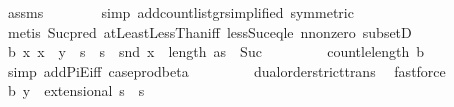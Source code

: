 \begin{isabellebody}
\ assms{\isacharparenleft}{\kern0pt}{}{\isacharparenright}{\kern0pt}\isanewline
\ \ \ \ \ \ \isamarkupfalse%
\ {\isacharparenleft}{\kern0pt}simp\ add{\isacharcolon}{\kern0pt}count{\isacharunderscore}{\kern0pt}list{\isacharunderscore}{\kern0pt}gr{\isacharunderscore}{\kern0pt}{}{\isacharbrackleft}{\kern0pt}simplified{\isacharcomma}{\kern0pt}\ symmetric{\isacharbrackright}{\kern0pt}{\isacharparenright}{\kern0pt}\ \isanewline
\ \ \ \ \ \ \isamarkupfalse%
\ {\isacharparenleft}{\kern0pt}metis\ Suc{\isacharunderscore}{\kern0pt}pred\ atLeastLessThan{\isacharunderscore}{\kern0pt}iff\ less{\isacharunderscore}{\kern0pt}Suc{\isacharunderscore}{\kern0pt}eq{\isacharunderscore}{\kern0pt}le\ n{\isacharunderscore}{\kern0pt}nonzero\ subsetD{\isacharparenright}{\kern0pt}\isanewline
\ \ \ \ \isamarkupfalse%
\ b{}{\isacharcolon}{\kern0pt}\ {\isachardoublequoteopen}{\isasymAnd}x{\isachardot}{\kern0pt}\ x\ {\isasymin}\ y\ {\isacharbackquote}{\kern0pt}\ {\isacharparenleft}{\kern0pt}{\isacharbraceleft}{\kern0pt}{}{\isachardot}{\kern0pt}{\isachardot}{\kern0pt}{\isacharless}{\kern0pt}s\ {\isasymtimes}\ {\isacharbraceleft}{\kern0pt}{}{\isachardot}{\kern0pt}{\isachardot}{\kern0pt}{\isacharless}{\kern0pt}s\ {\isasymLongrightarrow}\ snd\ x\ {\isasymle}\ length\ as\ {\isacharminus}{\kern0pt}\ Suc\ {}{\isachardoublequoteclose}\isanewline
\ \ \ \ \ \ \isamarkupfalse%
\ count{\isacharunderscore}{\kern0pt}le{\isacharunderscore}{\kern0pt}length\ b{}\ \isamarkupfalse%
\ {\isacharparenleft}{\kern0pt}simp\ add{\isacharcolon}{\kern0pt}PiE{\isacharunderscore}{\kern0pt}iff\ case{\isacharunderscore}{\kern0pt}prod{\isacharunderscore}{\kern0pt}beta{\isacharparenright}{\kern0pt}\ \isanewline
\ \ \ \ \ \ \isamarkupfalse%
\ dual{\isacharunderscore}{\kern0pt}order{\isachardot}{\kern0pt}strict{\isacharunderscore}{\kern0pt}trans{}\ \isamarkupfalse%
\ fastforce\isanewline
\ \ \ \ \isamarkupfalse%
\ b{}{\isacharcolon}{\kern0pt}\ {\isachardoublequoteopen}y\ {\isasymin}\ extensional\ {\isacharparenleft}{\kern0pt}{\isacharbraceleft}{\kern0pt}{}{\isachardot}{\kern0pt}{\isachardot}{\kern0pt}{\isacharless}{\kern0pt}s\ {\isasymtimes}\ {\isacharbraceleft}{\kern0pt}{}{\isachardot}{\kern0pt}{\isachardot}{\kern0pt}{\isacharless}{\kern0pt}s\ \isamarkupfalse%

\end{isabellebody}
